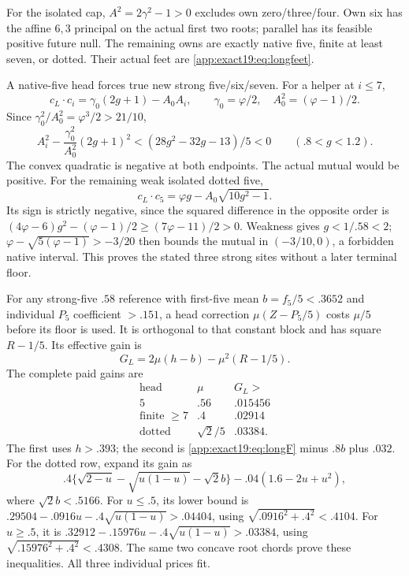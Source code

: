 For the isolated cap,
\(A^2=2\gamma^2-1>0\) excludes
own zero/three/four.
Own six has the affine \(6,3\)
principal on the actual first two
roots; parallel has its feasible
positive future null.
The remaining owns are exactly
native five, finite at least seven,
or dotted.
Their actual feet are
\eqref{app:exact19:eq:longfeet}.

A native-five head forces true
new strong five/six/seven.
For a helper at \(i\le7\),
\[
 c_L\cdot c_i=\gamma_0(2g+1)-A_0A_i,\qquad
       \gamma_0=\varphi/2,\quad A_0^2=(\varphi-1)/2 .
\]
Since \(\gamma_0^2/A_0^2=\varphi^3/2>21/10\),
\[
 A_i^2-\frac{\gamma_0^2}{A_0^2}(2g+1)^2
                   <(28g^2-32g-13)/5<0
                  \qquad(.8<g<1.2).
\]
The convex quadratic is negative
at both endpoints.
The actual mutual would be
positive.
For the remaining weak isolated
dotted five,
\[
 c_L\cdot c_5=\varphi g-A_0\sqrt{10g^2-1}.
\]
Its sign is strictly negative,
since the squared difference in
the opposite order is
\((4\varphi-6)g^2-(\varphi-1)/2
\ge(7\varphi-11)/2>0\).
Weakness gives \(g<1/.58<2\);
\(\varphi-\sqrt{5(\varphi-1)}>-3/20\)
then bounds the mutual in
\((-3/10,0)\), a forbidden native
interval.
This proves the stated three
strong sites without a later
terminal floor.

For any strong-five \(.58\)
reference with first-five mean
\(b=f_5/5<.3652\) and individual
\(P_5\) coefficient \(>.151\),
a head correction
\(\mu(Z-P_5/5)\) costs \(\mu/5\)
before its floor is used.
It is orthogonal to that constant
block and has square \(R-1/5\).
Its effective gain is
\[
                             G_L=2\mu(h-b)-\mu^2(R-1/5).
\]
The complete paid gains are
\[
\begin{array}{c|c|c}
 \text{head}&\mu&G_L>\\ \hline
 5&.56&.015456\\
 \text{finite }\ge7&.4&.02914\\
 \text{dotted}&\sqrt2/5&.03384 .
\end{array}
\tag{B19headgains}\label{app:exact19:eq:Bheadgains}
\]
The first uses \(h>.393\);
the second is
\eqref{app:exact19:eq:longF}
minus \(.8b\) plus \(.032\).
For the dotted row, expand its
gain as
\[
 .4\{\sqrt{2-u}-\sqrt{u(1-u)}-\sqrt2b\}
                                -.04(1.6-2u+u^2),
\]
where \(\sqrt2b<.5166\).
For \(u\le.5\), its lower bound is
\(.29504-.0916u-.4\sqrt{u(1-u)}>.04404\),
using \(\sqrt{.0916^2+.4^2}<.4104\).
For \(u\ge.5\), it is
\(.32912-.15976u-.4\sqrt{u(1-u)}>.03384\),
using \(\sqrt{.15976^2+.4^2}<.4308\).
The same two concave root chords
prove these inequalities.
All three individual prices fit.

